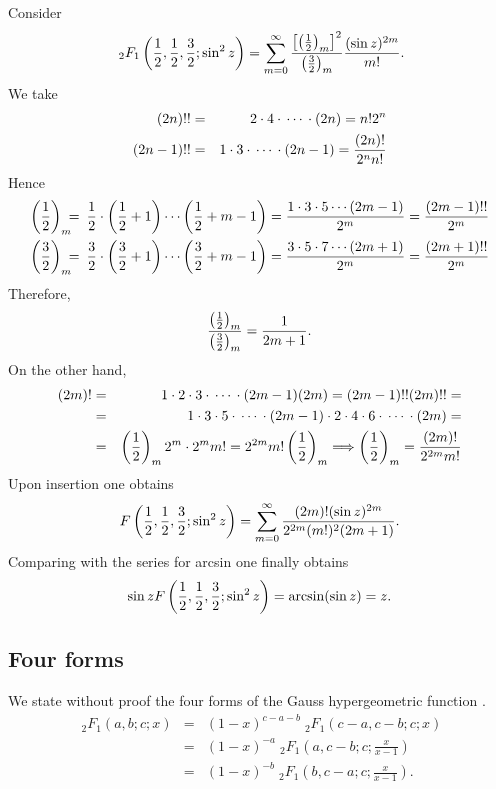 {\begin{enumerate}
Consider
$$
   {\;}_2F_1\left({1\over 2},{1\over 2},{3\over 2};\sin^2z\right)=
   \sum_{m=0}^\infty{\left[\left({1\over 2}\right)_m\right]^2\over
   \left({3\over 2}\right)_m}{(\sin z)^{2m}\over m!}.
$$
We take
\begin{eqnarray*}
   (2n)!!&=& 2\cdot4\cdot\,\cdots\,\cdot(2n)=n!2^n\\
   (2n-1)!!&=& 1\cdot3\cdot\,\cdots\,\cdot(2n-1)={(2n)!\over2^n n!}
\end{eqnarray*}
Hence
\begin{eqnarray*}
   \left({1\over 2}\right)_m\!\!\!&=\!\!\!&{1\over 2}\cdot
   \left({1\over 2}+1\right)\cdots\left({1\over 2}+m-1\right)=
   {1\cdot3\cdot5\cdots(2m-1)\over2^m}={(2m-1)!!\over2^m}\\
   \left({3\over 2}\right)_m\!\!\!&=\!\!\!&{3\over 2}\cdot
   \left({3\over 2}+1\right)\cdots\left({3\over 2}+m-1\right)=
   {3\cdot5\cdot7\cdots(2m+1)\over2^m}={(2m+1)!!\over2^m}
\end{eqnarray*}
Therefore,
$$
   {\left({1\over 2}\right)_m\over\left({3\over 2}\right)_m}=
   {1\over 2m+1}.
$$
On the other hand,
\begin{eqnarray*}
   (2m)!&=&1\cdot2\cdot3\cdot\,\cdots\,\cdot(2m-1)(2m)=(2m-1)!!(2m)!!=\\
        &=&1\cdot3\cdot5\cdot\,\cdots\,\cdot(2m-1)\cdot
           2\cdot4\cdot6\cdot\,\cdots\,\cdot(2m)=\\
        &=&\left({1\over 2}\right)_m2^m\cdot2^m m!=2^{2m}m!
           \left({1\over 2}\right)_m
   \Longrightarrow\left({1\over 2}\right)_m={(2m)!\over 2^{2m}m!}
\end{eqnarray*}
Upon insertion one obtains
$$
   F\left({1\over 2},{1\over 2},{3\over 2};\sin^2z\right)=
   \sum_{m=0}^\infty{(2m)!(\sin z)^{2m}\over 2^{2m}(m!)^2(2m+1)}.
$$
Comparing with the series for arcsin one finally obtains
$$
   \sin z F\left({1\over 2},{1\over 2},{3\over 2};\sin^2z\right)=
   \arcsin(\sin z)=z.
$$
\end{enumerate}
\eexample
}

\subsection{Four forms}


We state without proof the four forms of the
Gauss hypergeometric function \cite{macrobert:1967:she}.
\begin{eqnarray}
{\;}_2F_1(a,b;c;x)
&=&(1-x)^{c-a-b}{\;}_2F_1(c-a,c-b;c;x)\\
&=&(1-x)^{ -a }{\;}_2F_1\left( a,c-b;c;\frac{x}{x-1}\right)\\
&=&(1-x)^{ -b }{\;}_2F_1\left( b,c-a;c;\frac{x}{x-1}\right).
\end{eqnarray}


